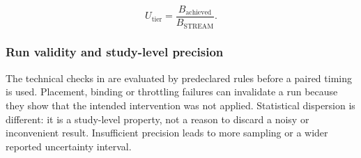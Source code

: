 \begin{equation}
\label{eq:utilisation}
  U_{\text{tier}} =
  \frac{B_{\text{achieved}}}{B_{\text{STREAM}}} .
\end{equation}

\subsubsection{Run validity and study-level precision}

The technical checks in  are evaluated by
predeclared rules before a paired timing is used.  Placement, binding or
throttling failures can invalidate a run because they show that the
intended intervention was not applied.  Statistical dispersion is
different: it is a study-level property, not a reason to discard a noisy
or inconvenient result.  Insufficient precision leads to more sampling
or a wider reported uncertainty interval.

